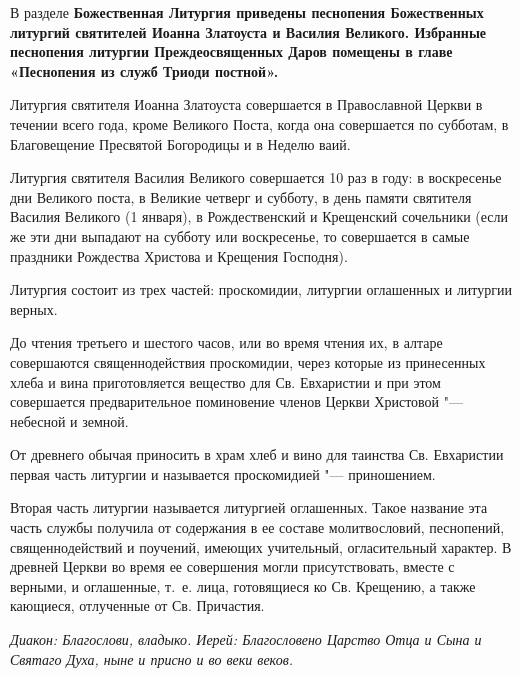 

\label{_content_Liturgiya}



В разделе \bfseries  Божественная Литургия\normalfont{} приведены песнопения Божественных литургий святителей Иоанна Златоуста и Василия Великого. Избранные песнопения литургии Преждеосвященных Даров помещены в главе «Песнопения из служб Триоди постной».


Литургия святителя Иоанна Златоуста совершается в Православной Церкви в течении всего года, кроме Великого Поста, когда она совершается по субботам, в Благовещение Пресвятой Богородицы и в Неделю ваий.


Литургия святителя Василия Великого совершается 10 раз в году: в воскресенье дни Великого поста, в Великие четверг и субботу, в день памяти святителя Василия Великого (1 января), в Рождественский и Крещенский сочельники (если же эти дни выпадают на субботу или воскресенье, то совершается в самые праздники Рождества Христова и Крещения Господня).

Литургия состоит из трех частей: проскомидии, литургии оглашенных и литургии верных.
 

 


До чтения третьего и шестого часов, или во время чтения их, в алтаре совершаются священнодействия проскомидии, через которые из принесенных хлеба и вина приготовляется вещество для Св. Евхаристии и при этом совершается предварительное поминовение членов Церкви Христовой "--- небесной и земной.


От древнего обычая приносить в храм хлеб и вино для таинства Св. Евхаристии первая часть литургии и называется проскомидией "--- приношением.
\mychapterending

 


Вторая часть литургии называется литургией оглашенных. Такое название эта часть службы получила от содержания в ее составе молитвословий, песнопений, священнодействий и поучений, имеющих учительный, огласительный характер. В древней Церкви во время ее совершения могли присутствовать, вместе с верными, и оглашенные, т.~е. лица, готовящиеся ко Св. Крещению, а также кающиеся, отлученные от Св. Причастия.


\itshape Диакон:\normalfont{} Благослови, владыко.
\itshape Иерей:\normalfont{} Благословено Царство Отца и Сына и Святаго Духа, ныне и присно и во веки веков. 


